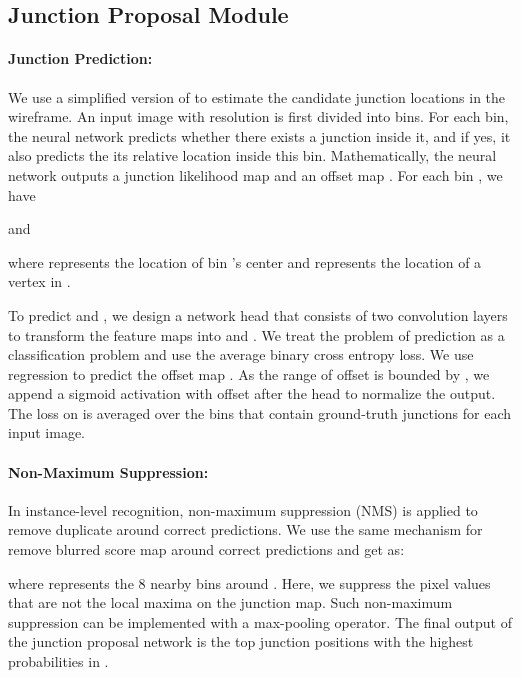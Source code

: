 \documentclass[10pt,twocolumn,letterpaper]{article}
\newcommand{\requireJunctype}[1]{}
\begin{document}
\subsection{Junction Proposal Module} \label{sec:junction}
\paragraph{Junction Prediction:}  We use a simplified version of \cite{Huang:2018:LPW} to estimate the candidate junction locations in the wireframe. An input image with resolution  is first divided into  bins. For each bin, the neural network predicts whether there exists a junction inside it, and if yes, it also predicts the its relative location inside this bin. Mathematically, the neural network outputs a junction likelihood map  and an offset map .  For each bin , we have

and

where  represents the location of bin 's center and  represents the location of a vertex in .  \requireJunctype{For the datasets that have labels of junction types, we simply replace them with multiple junction maps  and offset maps , where  represents the type of junctions.}

To predict  and , we design a network head that consists of two  convolution layers to transform the feature maps into  and . We treat the problem of prediction  as a classification problem and use the average binary cross entropy loss. We use  regression to predict the offset map . As the range of offset  is bounded by , we append a sigmoid activation with offset  after the head to normalize the output. The loss on  is averaged over the bins that contain ground-truth junctions for each input image.

\paragraph{Non-Maximum Suppression:}

In instance-level recognition, non-maximum suppression (NMS) is applied to remove duplicate around correct predictions. We use the same mechanism for remove blurred score map around correct predictions and get  as:

where  represents the 8 nearby bins around .  Here, we suppress the pixel values that are not the local maxima on the junction map. Such non-maximum suppression can be implemented with a max-pooling operator. The final output of the junction proposal network is the top  junction positions  with the highest probabilities in .
\end{document}
